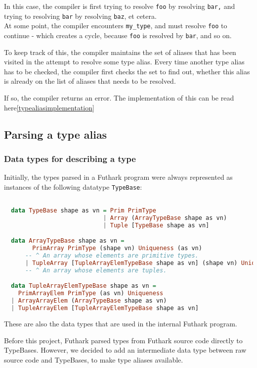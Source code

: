 \begin{enumerate}
    In this case, the compiler is first trying to resolve \texttt{foo} by
    resolving \texttt{bar,} and trying to resolving \texttt{bar} by resolving \texttt{baz}, et cetera. \\
    At some point, the compiler encounters \texttt{my\_type}, and must resolve \texttt{foo} to
    continue - which creates a cycle, because \texttt{foo} is resolved by \texttt{bar}, and so on.

    To keep track of this, the compiler maintains the set of aliases that has
    been visited in the attempt to resolve some type alias. Every time another
    type alias has to be checked, the compiler first checks the set to find out,
    whether this alias is already on the list of aliases that needs to be
    resolved.

    If so, the compiler returns an error.
    The implementation of this can be read here\ref{typealiasimplementation}
\end{enumerate}
\subsection{Parsing a type alias}
\subsubsection{Data types for describing a type}
Initially, the types parsed in a Futhark program were always represented as instances of the
following datatype \texttt{TypeBase}:
\begin{lstlisting}[language=Haskell]

  data TypeBase shape as vn = Prim PrimType
                            | Array (ArrayTypeBase shape as vn)
                            | Tuple [TypeBase shape as vn]

  data ArrayTypeBase shape as vn =
        PrimArray PrimType (shape vn) Uniqueness (as vn)
      -- ^ An array whose elements are primitive types.
      | TupleArray [TupleArrayElemTypeBase shape as vn] (shape vn) Uniqueness
      -- ^ An array whose elements are tuples.

  data TupleArrayElemTypeBase shape as vn =
    PrimArrayElem PrimType (as vn) Uniqueness
  | ArrayArrayElem (ArrayTypeBase shape as vn)
  | TupleArrayElem [TupleArrayElemTypeBase shape as vn]
\end{lstlisting}

These are also the data types that are used in the internal Futhark program.

Before this project, Futhark parsed types from Futhark source code directly to
TypeBases.
However, we decided to add an intermediate data type between raw source
code and TypeBases, to make type aliases available.

